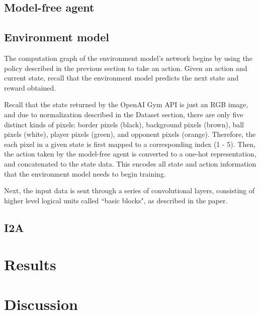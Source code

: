 \documentclass[10pt, twocolumn]{article}
\begin{document}
\subsection{Model-free agent}

\subsection{Environment model}

The computation graph of the environment model's network begins by using the policy described in the
previous section to take an action. Given an action and current state, recall that the environment model
predicts the next state and reward obtained.

Recall that the state returned by the OpenAI Gym API is just an RGB image, and due to normalization 
described in the Dataset section, there are only five distinct kinds of pixels: border pixels (black),
background pixels (brown), ball pixels (white), player pixels (green), and opponent pixels (orange).
Therefore, the each pixel in a given state is first mapped to a corresponding index (1 - 5). Then, the action
taken by the model-free agent is converted to a one-hot representation, and concatenated to the
state data. This encodes all state and action information that the environment model needs to begin training.

Next, the input data is sent through a series of convolutional layers, consisting of higher level logical units
called ``basic blocks", as described in the paper. 

\subsection{I2A}

\section{Results}

\section{Discussion}
\end{document}
